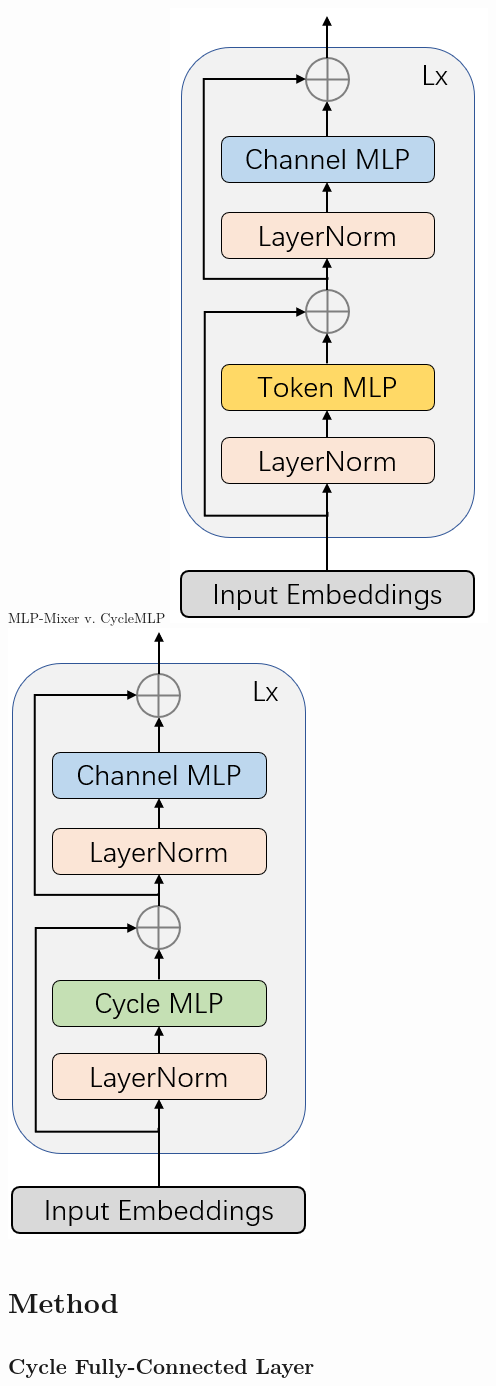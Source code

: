 \documentclass{beamer}
\begin{document}
\begin{frame}{MLP-Mixer v. CycleMLP}
    \includegraphics[width=.4\textwidth]{figures/mlp_mixer.png}
    \includegraphics[width=.4\textwidth]{figures/cycle_mlp.png}
\end{frame}

\section{Method}

\subsection{Cycle Fully-Connected Layer}
\end{document}
